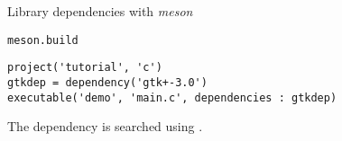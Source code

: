 \begin{frame}[fragile]{Library dependencies with {\em meson}}
  \begin{block}{{\tt meson.build}}
\begin{verbatim}
project('tutorial', 'c')
gtkdep = dependency('gtk+-3.0')
executable('demo', 'main.c', dependencies : gtkdep)
\end{verbatim}
  \end{block}
  The dependency  is searched using .
\end{frame}
